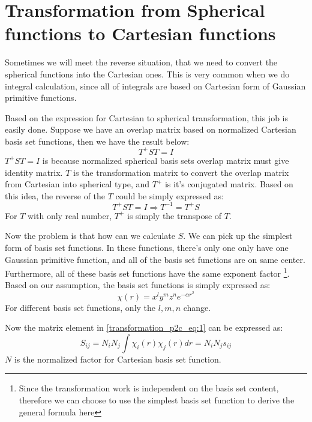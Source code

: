 \section{Transformation from Spherical functions to Cartesian functions}
\label{transformation_p2c}

Sometimes we will meet the reverse situation, that we need to convert the spherical functions
into the Cartesian ones. This is very common when we do integral calculation, since all of 
integrals are based on Cartesian form of Gaussian primitive functions.

Based on the expression for Cartesian to spherical transformation, this job is easily done.
Suppose we have an overlap matrix based on normalized Cartesian basis set functions, 
then we have the result below:
\begin{equation}
  \label{transformation_p2c_eq:1}
  T^{+}ST = I
\end{equation}
$T^{+}ST = I$ is because normalized spherical basis sets overlap matrix must give identity
matrix. $T$ is the transformation matrix to convert the overlap matrix from Cartesian 
into spherical type, and $T^{+}$ is it's conjugated matrix. Based on this idea,
the reverse of the $T$ could be simply expressed as:
\begin{equation}
 \label{transformation_p2c_eq:2}
 T^{+}ST = I \Rightarrow T^{-1} = T^{+}S 
\end{equation}
For $T$ with only real number, $T^{+}$ is simply the transpose of $T$.

Now the problem is that how can we calculate $S$. We can pick up the simplest form of basis
set functions. In these functions, there's only one only have one 
Gaussian primitive function, and all of the basis set functions are on same center. Furthermore,
all of these basis set functions have the same exponent factor
\footnote{Since the transformation work is independent on the 
basis set content, therefore we can choose to use the simplest basis set function to derive
the general formula here}. Based on our assumption, the basis set functions is simply expressed
as:
\begin{equation}
 \label{transformation_p2c_eq:3}
 \chi(r) = x^{l}y^{m}z^{n}e^{-\alpha r^{2}}
\end{equation}
For different basis set functions, only the $l,m,n$ change.

Now the matrix element in \ref{transformation_p2c_eq:1} can be expressed as:
\begin{equation}
 S_{ij} = N_{i}N_{j}\int\chi_{i}(r)\chi_{j}(r) dr = N_{i}N_{j}s_{ij}
\end{equation}
$N$ is the normalized factor for Cartesian basis set function.

